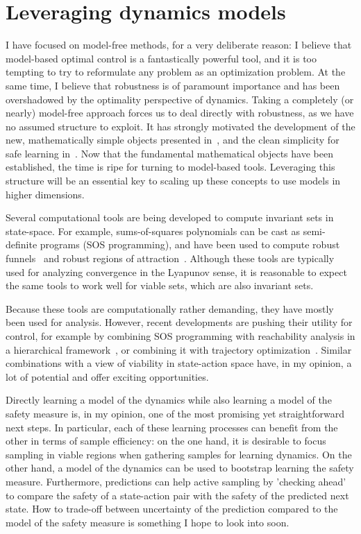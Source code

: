 \section{Leveraging dynamics models} \label{chap:discussion}
I have focused on model-free methods, for a very deliberate reason: I believe that model-based optimal control is a fantastically powerful tool, and it is too tempting to try to reformulate any problem as an optimization problem.
At the same time, I believe that robustness is of paramount importance and has been overshadowed by the optimality perspective of dynamics.
Taking a completely (or nearly) model-free approach forces us to deal directly with robustness, as we have no assumed structure to exploit.
It has strongly motivated the development of the new, mathematically simple objects presented in~\cite{heim2019beyond}, and the clean simplicity for safe learning in~\cite{heim2019learnable}.
Now that the fundamental mathematical objects have been established, the time is ripe for turning to model-based tools. Leveraging this structure will be an essential key to scaling up these concepts to use models in higher dimensions. \par
Several computational tools are being developed to compute invariant sets in state-space. For example, sums-of-squares polynomials can be cast as semi-definite programs (SOS programming), and have been used to compute robust funnels~\cite{majumdar2013robust} and robust regions of attraction~\cite{valmorbida2014roa_invariants}. Although these tools are typically used for analyzing convergence in the Lyapunov sense, it is reasonable to expect the same tools to work well for viable sets, which are also invariant sets. \par
Because these tools are computationally rather demanding, they have mostly been used for analysis. However, recent developments are pushing their utility for control, for example by combining SOS programming with reachability analysis in a hierarchical framework~\cite{singh2018robust}, or combining it with trajectory optimization~\cite{manchester2019robust}. Similar combinations with a view of viability in state-action space have, in my opinion, a lot of potential and offer exciting opportunities. \par
Directly learning a model of the dynamics while also learning a model of the safety measure is, in my opinion, one of the most promising yet straightforward next steps. In particular, each of these learning processes can benefit from the other in terms of sample efficiency: on the one hand, it is desirable to focus sampling in viable regions when gathering samples for learning dynamics. On the other hand, a model of the dynamics can be used to bootstrap learning the safety measure. Furthermore, predictions can help active sampling by 'checking ahead' to compare the safety of a state-action pair with the safety of the predicted next state. How to trade-off between uncertainty of the prediction compared to the model of the safety measure is something I hope to look into soon.